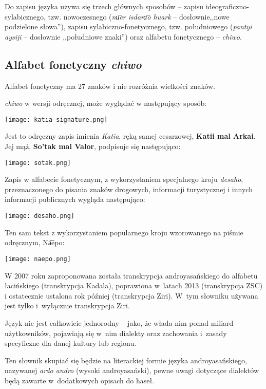 \begin{spacing}{1.1}
Do zapisu języka używa się trzech głównych sposobów -- zapisu
ideograficzno-sylabicznego, tzw. nowoczesnego (\emph{nu͞er isdara͞o huark} --
dosłownie,,nowe podzielone słowa''), zapisu sylabiczno-fonetycznego, tzw.
południowego (\emph{pantyi aysiji} -- dosłownie ,,południowe znaki'') oraz
alfabetu fonetycznego -- \emph{chiwo}.

\subsection{Alfabet fonetyczny \emph{chiwo}}

Alfabet fonetyczny ma 27 znaków i nie rozróżnia wielkości znaków.

\emph{chiwo} w wersji odręcznej, może wyglądać w następujący sposób:

\begin{center}
    \texttt{[image: katia-signature.png]}    
\end{center}

Jest to odręczny zapis imienia \emph{Katia}, ręką samej cesarzowej,
\textbf{Katii mal Arkai}. Jej mąż, \textbf{So'tak mal Valor}, podpisuje się 
następująco:

\begin{center}
    \texttt{[image: sotak.png]}
\end{center}

Zapis w alfabecie fonetycznym, z wykorzystaniem specjalnego kroju \emph{desaho},
przeznaczonego do pisania znaków drogowych, informacji turystycznej i innych
informacji publicznych wygląda następująco:

\begin{center}
    \texttt{[image: desaho.png]}
\end{center}

\skipline

Ten sam tekst z wykorzystaniem popularnego kroju wzorowanego na piśmie
odręcznym, Na͞epo:

\begin{center}
    \texttt{[image: naepo.png]}
\end{center}

W 2007 roku zaproponowana została transkrypcja androyasańskiego do alfabetu 
łacińskiego (transkrypcja Kadala), poprawiona w~latach 2013 (transkrypcja 
ZSC) i ostatecznie ustalona rok później (transkrypcja Ziri). W~tym słowniku
używana jest tylko i~wyłącznie transkrypcja Ziri.

Język nie jest całkowicie jednorodny -- jako, że włada nim ponad miliard 
użytkowników, pojawiają się w~nim dialekty oraz zachowania i~zasady specyficzne 
dla danej kultury lub regionu. 

Ten słownik skupiać się będzie na literackiej formie języka androyasańskiego,
nazywanej \emph{ardo andro} (wysoki androyasański), pewne uwagi dotyczące
dialektów będą zawarte w~dodatkowych opisach do haseł.

\end{spacing}